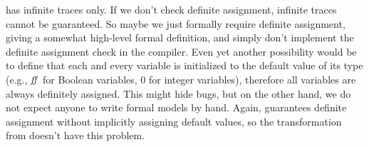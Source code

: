 \documentclass[a4paper,10pt,english]{article}
\begin{document}
\begin{itemize}
	has infinite traces only. If we don't check definite assignment, infinite traces cannot be guaranteed. So maybe we just formally
	require definite assignment, giving a somewhat high-level formal definition, and simply don't implement the definite assignment
	check in the \SSharp compiler. Even yet another possibility would be to define that each and every variable is initialized to the
	default value of its type (e.g., $\mathit{ff}$ for Boolean variables, $0$ for integer variables), therefore all variables are always
	definitely assigned. This might hide bugs, but on the other hand, we do not expect anyone to write formal models by hand. Again,
	\CSharp guarantees definite assignment without implicitly assigning default values, so the transformation from \CSharp doesn't
	have this problem.
\end{itemize}
\end{document}
